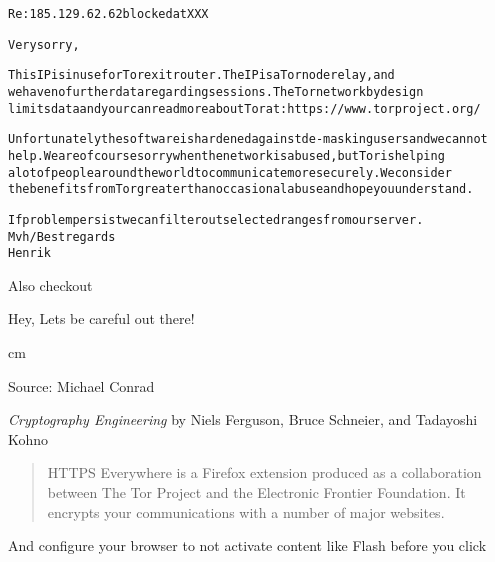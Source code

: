 \documentclass[20pt,landscape,a4paper,footrule]{foils}
\begin{document}
\begin{alltt}\small
Re: 185.129.62.62 blocked at XXX

Very sorry,

This IP is in use for Tor exit router. The IP is a Tor node relay, and
we have no further data regarding sessions. The Tor network by design
limits data and your can read more about Tor at: https://www.torproject.org/

Unfortunately the software is hardened against de-masking users and we cannot
help. We are of course sorry when the network is abused, but Tor is helping
a lot of people around the world to communicate more securely. We consider
the benefits from Tor greater than occasional abuse and hope you understand.

If problem persist we can filter out selected ranges from our server.
Mvh/Best regards
Henrik
\end{alltt}

Also checkout 


\centerline{\Large Hey, Lets be careful out there!}
 cm

\begin{center}
\myname

\end{center}

\vskip 2cm
Source: Michael Conrad 



\emph{Cryptography Engineering} by
Niels Ferguson, Bruce Schneier, and Tadayoshi Kohno




\begin{quote}
HTTPS Everywhere is a Firefox extension produced as a collaboration between The Tor Project and the Electronic Frontier Foundation. It encrypts your communications with a number of major websites.
\end{quote}

\centerline{}

And configure your browser to not activate content like Flash before you click
\end{document}
